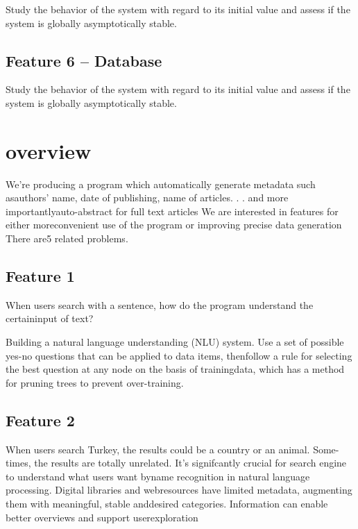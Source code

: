 \documentclass[a4paper]{article} %
\begin{document}
	Study the behavior of the system with regard to its initial value and assess if the system is globally asymptotically stable.
	
	\subsection*{Feature 6 -- Database}
	\label{task1:feature6}
	
	Study the behavior of the system with regard to its initial value and assess if the system is globally asymptotically stable.
	
	
	
	\section*{overview}
	\label{task1}
	We're  producing  a  program  which  automatically  generate  metadata  such  asauthors' name,  date of publishing,  name of articles. . .   and more importantlyauto-abstract for full text articles We are interested in features for either moreconvenient use of the program or improving precise data generation There are5 related problems.
	
	
	\subsection*{Feature 1 }
	\label{task1:feature1}
	When users search with a sentence, how do the program understand the certaininput of text?
	
	Building a natural language understanding (NLU) system.
	Use a set of possible yes-no questions that can be applied to data items, thenfollow a rule for selecting the best question at any node on the basis of trainingdata, which has a method for pruning trees to prevent over-training.
	
	\subsection*{Feature 2 }
	\label{task1:feature2}
	
	When users search Turkey, the results could be a country or an animal.  Some-times, the results are totally unrelated.
	It's  signifcantly  crucial  for  search  engine  to  understand  what  users  want  byname  recognition  in  natural  language  processing.   Digital  libraries  and  webresources have limited metadata, augmenting them with meaningful, stable anddesired categories.  Information can enable better overviews and support userexploration
\end{document}
